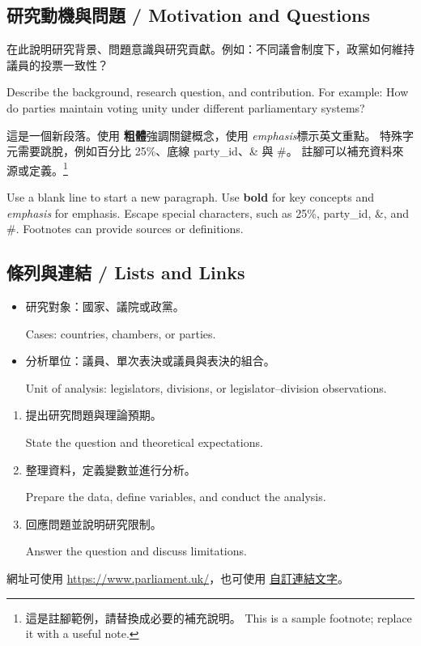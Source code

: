 \documentclass[11pt,a4paper]{article}
\begin{document}
\subsection{研究動機與問題 / Motivation and Questions}
在此說明研究背景、問題意識與研究貢獻。例如：不同議會制度下，政黨如何維持議員的投票一致性？

Describe the background, research question, and contribution. For example: How do parties maintain voting unity under different parliamentary systems?

這是一個新段落。使用 \textbf{粗體}強調關鍵概念，使用 \emph{emphasis}標示英文重點。
特殊字元需要跳脫，例如百分比 25\%、底線 party\_id、\& 與 \#。
註腳可以補充資料來源或定義。\footnote{這是註腳範例，請替換成必要的補充說明。 This is a sample footnote; replace it with a useful note.}

Use a blank line to start a new paragraph. Use \textbf{bold} for key concepts and \emph{emphasis} for emphasis. Escape special characters, such as 25\%, party\_id, \&, and \#. Footnotes can provide sources or definitions.

\subsection{條列與連結 / Lists and Links}
\begin{itemize}
  \item 研究對象：國家、議院或政黨。\par Cases: countries, chambers, or parties.
  \item 分析單位：議員、單次表決或議員與表決的組合。\par Unit of analysis: legislators, divisions, or legislator--division observations.
\end{itemize}
\begin{enumerate}[label=\arabic*.]
  \item 提出研究問題與理論預期。\par State the question and theoretical expectations.
  \item 整理資料，定義變數並進行分析。\par Prepare the data, define variables, and conduct the analysis.
  \item 回應問題並說明研究限制。\par Answer the question and discuss limitations.
\end{enumerate}
網址可使用 \url{https://www.parliament.uk/}，也可使用
\href{https://www.parliament.uk/}{自訂連結文字}。
\end{document}
